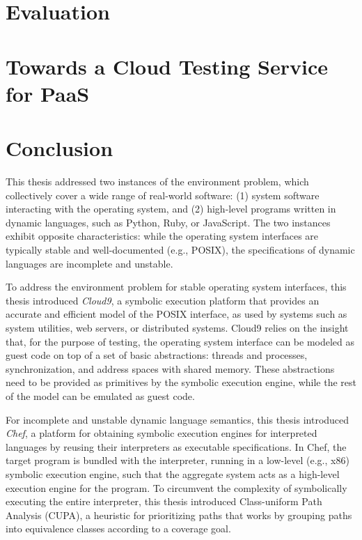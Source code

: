 \documentclass[letterpaper,10pt,oneside]{book}
\newcommand{\cnine}{Cloud9\xspace}
\newcommand{\chef}{Chef\xspace}
\begin{document}
\chapter{Evaluation}
\label{ch:evaluation}


\chapter{Towards a Cloud Testing Service for PaaS}
\label{ch:paas}


\chapter{Conclusion}
\label{ch:conclusion}

This thesis addressed two instances of the environment problem, which collectively cover a wide range of real-world software: (1) system software interacting with the operating system, and (2) high-level programs written in dynamic languages, such as Python, Ruby, or JavaScript.  The two instances exhibit opposite characteristics: while the operating system interfaces are typically stable and well-documented (e.g., POSIX), the specifications of dynamic languages are incomplete and unstable.

To address the environment problem for stable operating system interfaces, this thesis introduced \emph{\cnine}, a symbolic execution platform that provides an accurate and efficient model of the POSIX interface, as used by systems such as system utilities, web servers, or distributed systems.
%
\cnine relies on the insight that, for the purpose of testing, the operating system interface can be modeled as guest code on top of a set of basic abstractions: threads and processes, synchronization, and address spaces with shared memory. These abstractions need to be provided as primitives by the symbolic execution engine, while the rest of the model can be emulated as guest code.

For incomplete and unstable dynamic language semantics, this thesis introduced \emph{\chef}, a platform for obtaining symbolic execution engines for interpreted languages by reusing their interpreters as executable specifications.  In \chef, the target program is bundled with the interpreter, running in a low-level (e.g., x86) symbolic execution engine, such that the aggregate system acts as a high-level execution engine for the program.
%
%
To circumvent the complexity of symbolically executing the entire interpreter, this thesis introduced Class-uniform Path Analysis (CUPA), a heuristic for prioritizing paths that works by grouping paths into equivalence classes according to a coverage goal.



\end{document}
